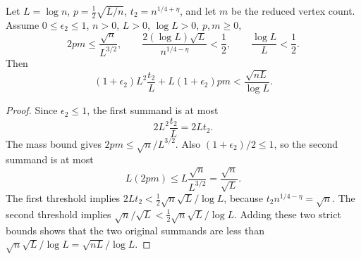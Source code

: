 \begin{helper}
Let \(L=\log n\), \(p=\frac12\sqrt{L/n}\), \(t_2=n^{1/4+\eta}\), and let
\(m\) be the reduced vertex count.  Assume \(0\le\epsilon_2\le1\), \(n>0\),
\(L>0\), \(\log L>0\), \(p,m\ge0\),
\[
2pm\le \frac{\sqrt n}{L^{3/2}},\qquad
\frac{2(\log L)\sqrt L}{n^{1/4-\eta}}<\frac12,\qquad
\frac{\log L}{L}<\frac12.
\]
Then
\[
(1+\epsilon_2)L^2\frac{t_2}{L}
  +L(1+\epsilon_2)pm
< \frac{\sqrt{nL}}{\log L}.
\]
\end{helper}
\begin{proof}
Since \(\epsilon_2\le1\), the first summand is at most
\[
2L^2\frac{t_2}{L}=2Lt_2.
\]
The mass bound gives \(2pm\le \sqrt n/L^{3/2}\).  Also
\((1+\epsilon_2)/2\le1\), so the second summand is at most
\[
L(2pm)\le L\frac{\sqrt n}{L^{3/2}}=\frac{\sqrt n}{\sqrt L}.
\]
The first threshold implies \(2Lt_2<\frac12\sqrt n\sqrt L/\log L\), because
\(t_2n^{1/4-\eta}=\sqrt n\).  The second threshold implies
\(\sqrt n/\sqrt L<\frac12\sqrt n\sqrt L/\log L\).  Adding these two strict
bounds shows that the two original summands are less than
\(\sqrt n\sqrt L/\log L=\sqrt{nL}/\log L\).
\end{proof}
